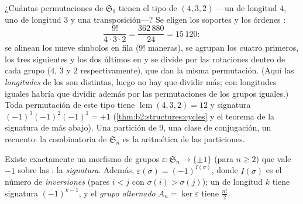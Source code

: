 \begin{example}\label{ex:b2:structures:cycletype}
¿Cuántas permutaciones de $\mathfrak{S}_9$ tienen el tipo de
 $(4, 3, 2)$ ---un  de longitud $4$, uno de longitud
$3$ y una transposición---? Se eligen los soportes y los órdenes
:
\[
\frac{9!}{4\cdot 3\cdot 2}
= \frac{362\,880}{24} = 15\,120 :
\]
se alinean los nueve símbolos en fila ($9!$ maneras), se agrupan
los cuatro primeros, los tres siguientes y los dos últimos en
 y se divide por las rotaciones dentro de cada grupo
($4$, $3$ y $2$ respectivamente), que dan la misma permutación.
(Aquí las \emph{longitudes} de los  son distintas, luego no
hay que dividir más; con longitudes iguales habría que dividir
además por las permutaciones de los grupos iguales.) Toda
permutación de este tipo tiene  $\operatorname{lcm}(4,3,2) =
12$ y signatura $(-1)^3(-1)^2(-1)^1 = +1$
(\cref{thm:b2:structures:cycles} y el teorema de la signatura de
más abajo). Una partición de $9$, una clase de conjugación, un
recuento: la combinatoria de $\mathfrak{S}_n$ es la aritmética de
las particiones.
\end{example}

\begin{theorem}[Signatura]\label{thm:b2:structures:signature}
Existe exactamente un morfismo de grupos $\varepsilon \colon
\mathfrak{S}_n \to \{\pm 1\}$ (para $n \geq 2$) que vale $-1$ sobre
las : la \emph{signatura}. Además,
$\varepsilon(\sigma) = (-1)^{I(\sigma)}$, donde $I(\sigma)$ es el
número de \emph{inversiones} (pares $i < j$ con $\sigma(i) >
\sigma(j)$); un  de longitud $k$ tiene signatura $(-1)^{k-1}$, y
el \emph{grupo alternado} $A_n = \ker\varepsilon$ tiene 
$\frac{n!}{2}$.
\end{theorem}

